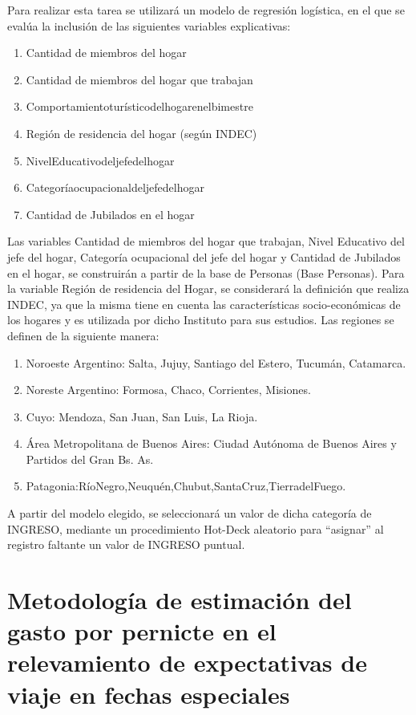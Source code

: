 \documentclass[
  openany]{book}
\begin{document}
Para realizar esta tarea se utilizará un modelo de regresión logística, en el que se evalúa la inclusión de las siguientes variables explicativas:

\begin{enumerate}
\def\labelenumi{\arabic{enumi}.}
\item
  Cantidad de miembros del hogar
\item
  Cantidad de miembros del hogar que trabajan
\item
  Comportamientoturísticodelhogarenelbimestre
\item
  Región de residencia del hogar (según INDEC)
\item
  NivelEducativodeljefedelhogar
\item
  Categoríaocupacionaldeljefedelhogar
\item
  Cantidad de Jubilados en el hogar
\end{enumerate}

Las variables Cantidad de miembros del hogar que trabajan, Nivel Educativo del jefe del hogar, Categoría ocupacional del jefe del hogar y Cantidad de Jubilados en el hogar, se construirán a partir de la base de Personas (Base Personas). Para la variable Región de residencia del Hogar, se considerará la definición que realiza INDEC, ya que la misma tiene en cuenta las características socio-económicas de los hogares y es utilizada por dicho Instituto para sus estudios. Las regiones se definen de la siguiente manera:

\begin{enumerate}
\def\labelenumi{\arabic{enumi}.}
\item
  Noroeste Argentino: Salta, Jujuy, Santiago del Estero, Tucumán, Catamarca.
\item
  Noreste Argentino: Formosa, Chaco, Corrientes, Misiones.
\item
  Cuyo: Mendoza, San Juan, San Luis, La Rioja.
\item
  Área Metropolitana de Buenos Aires: Ciudad Autónoma de Buenos Aires y Partidos del Gran Bs. As.
\item
  Patagonia:RíoNegro,Neuquén,Chubut,SantaCruz,TierradelFuego.
\end{enumerate}

A partir del modelo elegido, se seleccionará un valor de dicha categoría de INGRESO, mediante un procedimiento Hot-Deck aleatorio para ``asignar'' al registro faltante un valor de INGRESO puntual.

\hypertarget{metodologuxeda-de-estimaciuxf3n-del-gasto-por-pernicte-en-el-relevamiento-de-expectativas-de-viaje-en-fechas-especiales}{%
\section{Metodología de estimación del gasto por pernicte en el relevamiento de expectativas de viaje en fechas especiales}\label{metodologuxeda-de-estimaciuxf3n-del-gasto-por-pernicte-en-el-relevamiento-de-expectativas-de-viaje-en-fechas-especiales}}
\end{document}
